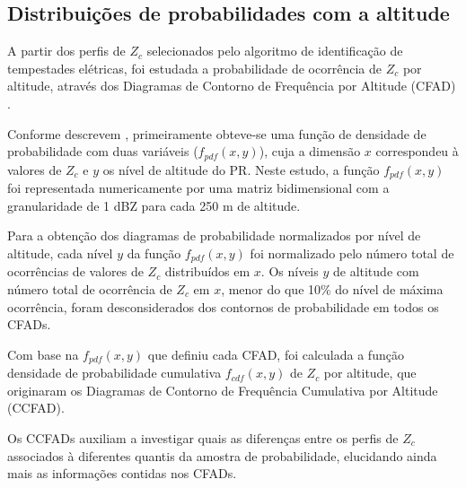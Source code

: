 \subsection{Distribuições de probabilidades com a altitude}

A partir dos perfis de $Z_c$ selecionados pelo algoritmo de identificação de tempestades elétricas, foi estudada a probabilidade de ocorrência de $Z_c$ por altitude, através dos Diagramas de Contorno de Frequência por Altitude (CFAD) \cite{yuter1995}.

Conforme descrevem , primeiramente obteve-se uma função de densidade de probabilidade com duas variáveis ($f_{pdf}(x,y)$), cuja a dimensão $x$ correspondeu à valores de $Z_{c}$ e $y$ os nível de altitude do PR. Neste estudo, a função $f_{pdf}(x,y)$ foi representada numericamente por uma matriz bidimensional com a granularidade de 1 dBZ para cada 250 m de altitude.



Para a obtenção dos diagramas de probabilidade normalizados por nível de altitude, cada nível $y$ da função $f_{pdf}(x,y)$ foi normalizado pelo número total de ocorrências de valores de $Z_c$ distribuídos em $x$. Os níveis $y$ de altitude com número total de ocorrência de $Z_c$ em $x$, menor do que 10\% do nível de máxima ocorrência, foram desconsiderados dos contornos de probabilidade em todos os CFADs.

Com base na $f_{pdf}(x,y)$ que definiu cada CFAD, foi calculada a função densidade de probabilidade cumulativa $f_{cdf}(x,y)$ de $Z_c$ por altitude, que originaram os Diagramas de Contorno de Frequência Cumulativa por Altitude (CCFAD).     


Os CCFADs auxiliam a investigar quais as diferenças entre os perfis de $Z_c$ associados à diferentes quantis da amostra de probabilidade, elucidando ainda mais as informações contidas nos CFADs.


